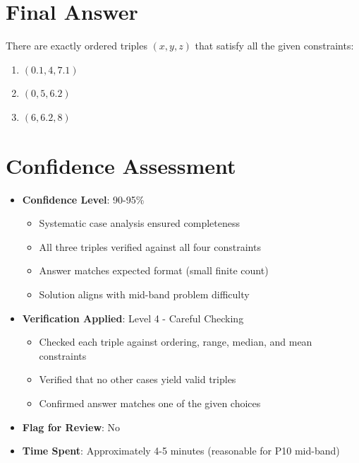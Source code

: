 \documentclass[11pt]{article}
\begin{document}
\section*{Final Answer}

There are exactly  ordered triples $(x, y, z)$ that satisfy all the given constraints:
\begin{enumerate}
    \item $(0.1, 4, 7.1)$
    \item $(0, 5, 6.2)$  
    \item $(6, 6.2, 8)$
\end{enumerate}

\section*{Confidence Assessment}
\begin{itemize}[leftmargin=*]
    \item \textbf{Confidence Level}: 90-95\%
    \begin{itemize}
        \item Systematic case analysis ensured completeness
        \item All three triples verified against all four constraints
        \item Answer matches expected format (small finite count)
        \item Solution aligns with mid-band problem difficulty
    \end{itemize}
    
    \item \textbf{Verification Applied}: Level 4 - Careful Checking
    \begin{itemize}
        \item Checked each triple against ordering, range, median, and mean constraints
        \item Verified that no other cases yield valid triples
        \item Confirmed answer matches one of the given choices
    \end{itemize}
    
    \item \textbf{Flag for Review}: No
    
    \item \textbf{Time Spent}: Approximately 4-5 minutes (reasonable for P10 mid-band)
\end{itemize}
\end{document}
